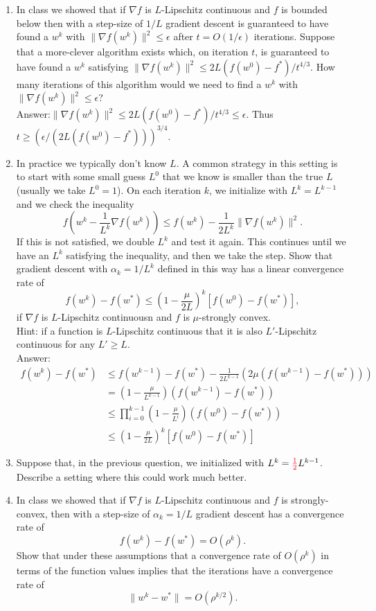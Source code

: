 \documentclass{article}
\def\blu#1{{\color{blu}#1}}
\def\gre#1{{\color{gre}#1}}
\def\red#1{{\color{red}#1}}
\def\norm#1{\|#1\|}
\def\half{\frac 1 2}
\def\enum#1{\begin{enumerate}#1\end{enumerate}}
\begin{document}
\enum{
\item In class we showed that if $\nabla f$ is $L$-Lipschitz continuous and $f$ is bounded below then with a step-size of $1/L$ gradient descent is guaranteed to have found a $w^k$ with $\norm{\nabla f(w^k)}^2 \leq \epsilon$ after $t = O(1/\epsilon)$ iterations. Suppose that a more-clever algorithm exists which, on iteration $t$, is guaranteed to have found a $w^k$ satisfying $\norm{\nabla f(w^k)}^2 \leq 2L(f(w^0) - f^*)/t^{4/3}$. \blu{How many iterations of this algorithm would we need to find a $w^k$ with $\norm{\nabla f(w^k)}^2 \leq \epsilon$?}
\gre{
\\ Answer:$\norm{\nabla f(w^k)}^2 \leq 2L(f(w^0) - f^*)/t^{4/3}\leq \epsilon$. Thus $t \geq (\epsilon/(2L(f(w^0) - f^*)))^{3/4}$.
}
\item In practice we typically don't know $L$. A common strategy in this setting is to start with some small guess $L^0$ that we know is smaller than the true $L$ (usually we take $L^0=1$). On each iteration $k$, we initialize with $L^k = L^{k-1}$ and we check the inequality
\[
f\left(w^k - \frac{1}{L^k}\nabla f(w^k)\right) \leq f(w^k) - \frac{1}{2L^k}\norm{\nabla f(w^k)}^2.
\]
If this is not satisfied, we double $L^k$ and test it again. This continues until we have an $L^k$ satisfying the inequality, and then we take the step. \blu{Show that gradient descent with $\alpha_k = 1/L^k$ defined in this way has a linear convergence rate of
\[
f(w^k) - f(w^*) \leq \left(1 - \frac{\mu}{2L}\right)^k[f(w^0) - f(w^*)],
\]
\red{if $\nabla f$ is $L$-Lipschitz continuousn and $f$ is $\mu$-strongly convex.}\\
} Hint: if a function is $L$-Lipschitz continuous that it is also $L'$-Lipschitz continuous for any $L' \geq L$.
\gre{
\\ Answer:\begin{align*}
f(w^{k})-f(w^*) &\leq f(w^{k-1})-f(w^*)-\frac{1}{2L^{k-1}}(2\mu(f(w^{k-1})-f(w^*))) \\
 & = (1-\frac{\mu}{L^{k-1}})(f(w^{k-1})-f(w^*))\\
 & \leq \prod_{i=0}^{k-1}(1-\frac{\mu}{L^i})(f(w^0)-f(w^*))\\
 & \leq \left(1 - \frac{\mu}{2L}\right)^k[f(w^0) - f(w^*)]
\end{align*}
}
\item Suppose that, in the previous question, we initialized with $L^k = \red{\half}L^{k-1}$. \blu{Describe a setting where this could work much better}.
\item In class we showed that if $\nabla f$ is $L$-Lipschitz continuous and $f$ is strongly-convex, then with a step-size of $\alpha_k = 1/L$ gradient descent has a convergence rate of 
\[
f(w^k) - f(w^*) = O(\rho^k).
\]
\blu{Show that under these assumptions that a convergence rate of $O(\rho^k)$ in terms of the function values implies that the iterations have a convergence rate of
\[
\norm{w^k - w^*} = O(\rho^{k/2}).
\]}
}
\end{document}
